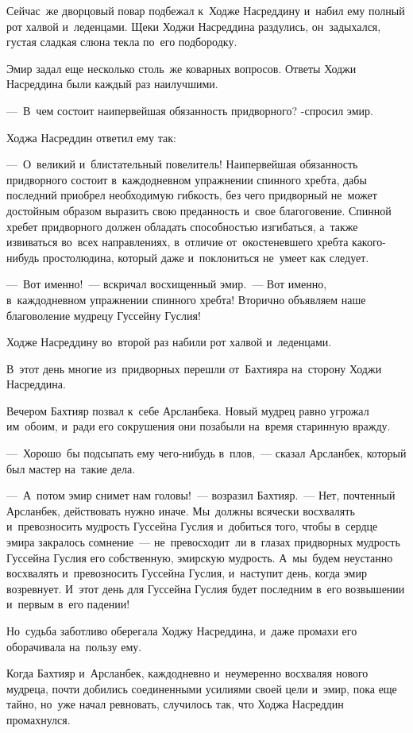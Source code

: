 \documentclass[12pt,a4paper]{book}
\begin{document}
Сейчас~же дворцовый повар подбежал к~Ходже Насреддину и~набил ему полный рот халвой и~леденцами. Щеки Ходжи Насреддина раздулись, он~задыхался, густая сладкая слюна текла по~его подбородку.

Эмир задал еще несколько столь~же коварных вопросов. Ответы Ходжи Насреддина были каждый раз наилучшими.

—~В~чем состоит наипервейшая обязанность придворного? -спросил эмир.

Ходжа Насреддин ответил ему так:

—~О~великий и~блистательный повелитель! Наипервейшая обязанность придворного состоит в~каждодневном упражнении спинного хребта, дабы последний приобрел необходимую гибкость, без чего придворный не~может достойным образом выразить свою преданность и~свое благоговение. Спинной хребет придворного должен обладать способностью изгибаться, а~также извиваться во~всех направлениях, в~отличие от~окостеневшего хребта какого-нибудь простолюдина, который даже и~поклониться не~умеет как следует.

—~Вот именно!~— вскричал восхищенный эмир.~— Вот именно, в~каждодневном упражнении спинного хребта! Вторично объявляем наше благоволение мудрецу Гуссейну Гуслия!

Ходже Насреддину во~второй раз набили рот халвой и~леденцами.

В~этот день многие из~придворных перешли от~Бахтияра на~сторону Ходжи Насреддина.

Вечером Бахтияр позвал к~себе Арсланбека. Новый мудрец равно угрожал им~обоим, и~ради его сокрушения они позабыли на~время старинную вражду.

—~Хорошо~бы подсыпать ему чего-нибудь в~плов,~— сказал Арсланбек, который был мастер на~такие дела.

—~А~потом эмир снимет нам головы!~— возразил Бахтияр.~— Нет, почтенный Арсланбек, действовать нужно иначе. Мы~должны всячески восхвалять и~превозносить мудрость Гуссейна Гуслия и~добиться того, чтобы в~сердце эмира закралось сомнение~— не~превосходит~ли в~глазах придворных мудрость Гуссейна Гуслия его собственную, эмирскую мудрость. А~мы~будем неустанно восхвалять и~превозносить Гуссейна Гуслия, и~наступит день, когда эмир возревнует. И~этот день для Гуссейна Гуслия будет последним в~его возвышении и~первым в~его падении!

Но~судьба заботливо оберегала Ходжу Насреддина, и~даже промахи его оборачивала на~пользу ему.

Когда Бахтияр и~Арсланбек, каждодневно и~неумеренно восхваляя нового мудреца, почти добились соединенными усилиями своей цели и~эмир, пока еще тайно, но~уже начал ревновать, случилось так, что Ходжа Насреддин промахнулся.
\end{document}
